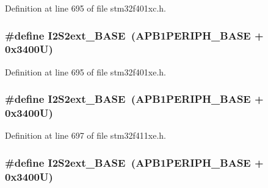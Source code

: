 Definition at line 695 of file stm32f401xc.\+h.

\subsubsection[{\texorpdfstring{I2\+S2ext\+\_\+\+B\+A\+SE}{I2S2ext_BASE}}]{\setlength{\rightskip}{0pt plus 5cm}\#define I2\+S2ext\+\_\+\+B\+A\+SE~({\bf A\+P\+B1\+P\+E\+R\+I\+P\+H\+\_\+\+B\+A\+SE} + 0x3400\+U)}\hypertarget{group___peripheral__registers__structures_gaa5f7b241ed5b756decd835300c9e7bc9}{}\label{group___peripheral__registers__structures_gaa5f7b241ed5b756decd835300c9e7bc9}


Definition at line 695 of file stm32f401xe.\+h.

\subsubsection[{\texorpdfstring{I2\+S2ext\+\_\+\+B\+A\+SE}{I2S2ext_BASE}}]{\setlength{\rightskip}{0pt plus 5cm}\#define I2\+S2ext\+\_\+\+B\+A\+SE~({\bf A\+P\+B1\+P\+E\+R\+I\+P\+H\+\_\+\+B\+A\+SE} + 0x3400\+U)}\hypertarget{group___peripheral__registers__structures_gaa5f7b241ed5b756decd835300c9e7bc9}{}\label{group___peripheral__registers__structures_gaa5f7b241ed5b756decd835300c9e7bc9}


Definition at line 697 of file stm32f411xe.\+h.

\subsubsection[{\texorpdfstring{I2\+S2ext\+\_\+\+B\+A\+SE}{I2S2ext_BASE}}]{\setlength{\rightskip}{0pt plus 5cm}\#define I2\+S2ext\+\_\+\+B\+A\+SE~({\bf A\+P\+B1\+P\+E\+R\+I\+P\+H\+\_\+\+B\+A\+SE} + 0x3400\+U)}\hypertarget{group___peripheral__registers__structures_gaa5f7b241ed5b756decd835300c9e7bc9}{}\label{group___peripheral__registers__structures_gaa5f7b241ed5b756decd835300c9e7bc9}


